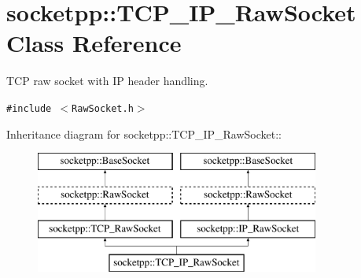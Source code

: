 \hypertarget{classsocketpp_1_1TCP__IP__RawSocket}{
\section{socketpp::TCP\_\-IP\_\-RawSocket Class Reference}
\label{classsocketpp_1_1TCP__IP__RawSocket}
}
TCP raw socket with IP header handling.  


{\tt \#include $<$RawSocket.h$>$}

Inheritance diagram for socketpp::TCP\_\-IP\_\-RawSocket::\begin{figure}[H]
\begin{center}
\leavevmode
\includegraphics[height=4cm]{classsocketpp_1_1TCP__IP__RawSocket}
\end{center}
\end{figure}
